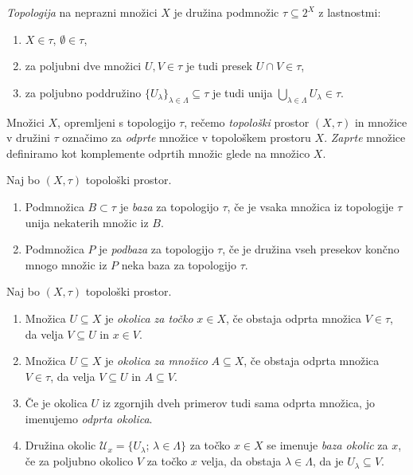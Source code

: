 \documentclass[mat1]{fmfdelo}
\newcommand{\Ucurl}{\mathcal{U}}
\begin{document}
\begin{definicija}\label{def:topologija}
\emph{Topologija} na neprazni množici $X$ je družina podmnožic $\tau \subseteq 2^X$ z lastnostmi:
\begin{enumerate}
\item $X \in \tau$, $\emptyset \in \tau$,
\item za poljubni dve množici $U,V \in \tau$ je tudi presek $U \cap V \in \tau$,
\item za poljubno poddružino $\lbrace U_{\lambda} \rbrace_{\lambda \in \Lambda} \subseteq \tau$ je tudi unija $\bigcup\limits_{\lambda \in \Lambda}^{} U_{\lambda} \in \tau$.
\end{enumerate}
Množici $X$, opremljeni s topologijo $\tau$, rečemo \emph{topološki} prostor $(X, \tau)$ in množice v družini $\tau$ označimo za \emph{odprte} množice v topološkem prostoru $X$. \emph{Zaprte} množice definiramo kot komplemente odprtih množic glede na množico $X$.
\end{definicija}

\begin{definicija}\label{def:baza}
Naj bo $(X, \tau)$ topološki prostor.
\begin{enumerate}
\item Podmnožica $B \subset \tau$ je \emph{baza} za topologijo $\tau$, če je vsaka množica iz topologije $\tau$ unija nekaterih množic iz $B$.
\item Podmnožica $P$ je \emph{podbaza} za topologijo $\tau$, če je družina vseh presekov končno mnogo množic iz $P$ neka baza za topologijo $\tau$.
\end{enumerate}
\end{definicija}

\begin{definicija}\label{def:okolica}
Naj bo $(X, \tau)$ topološki prostor.
\begin{enumerate}
\item Množica $U \subseteq X$ je \emph{okolica za točko} $x \in X$, če obstaja odprta množica $V \in \tau$, da velja $V \subseteq U$ in $x \in V$.
\item Množica $U \subseteq X$ je \emph{okolica za množico} $A \subseteq X$, če obstaja odprta množica $V \in \tau$, da velja $V \subseteq U$ in $A \subseteq V$.
\item Če je okolica $U$ iz zgornjih dveh primerov tudi sama odprta množica, jo imenujemo \emph{odprta okolica}.
\item Družina okolic $\Ucurl_x = \lbrace U_\lambda$; $\lambda \in \Lambda \rbrace$ za točko $x \in X$ se imenuje \emph{baza okolic} za $x$, če za poljubno okolico $V$ za točko $x$ velja, da obstaja $\lambda \in \Lambda$, da je $U_\lambda \subseteq V$.
\end{enumerate}
\end{definicija}
\end{document}
